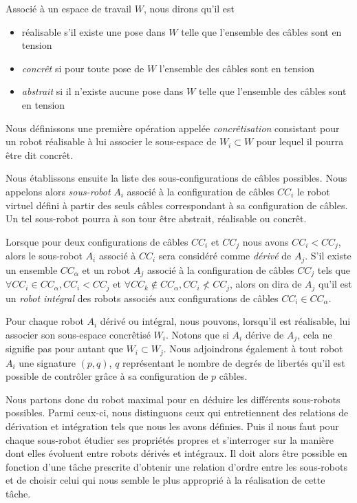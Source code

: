 Associ\'e à un espace de travail $W$, nous dirons qu'il est
\begin{itemize}
 \item {r\'ealisable} s'il existe une pose dans $W$ telle que l'ensemble des 
c\^ables sont en tension
  \item {\it concr\^et} si pour toute pose de $W$ l'ensemble des c\^ables sont 
en tension
  \item {\it abstrait} si il n'existe aucune pose dans $W$ telle que l'ensemble 
des c\^ables sont en tension
\end{itemize}

Nous d\'efinissons une première op\'eration appel\'ee {\it concr\^etisation} 
consistant pour un robot r\'ealisable \`a lui associer le sous-espace de $W_i 
\subset W$ pour lequel il pourra \^etre dit concr\^et. 

Nous \'etablissons ensuite la liste des sous-configurations de c\^ables 
possibles. Nous appelons alors {\it sous-robot} $A_i$ associ\'e \`a la 
configuration de c\^ables $CC_i$ le robot virtuel d\'efini \`a partir des seuls 
c\^ables correspondant \`a sa configuration de c\^ables. Un tel sous-robot 
pourra \`a son tour \^etre abstrait, r\'ealisable ou concr\^et.

Lorsque pour deux configurations de c\^ables $CC_i$ et $CC_j$ nous avons $CC_i< 
CC_j$, alors le sous-robot $A_i$ associ\'e \`a $CC_i$ sera consid\'er\'e comme 
{\it d\'eriv\'e} de $A_j$. S'il existe un ensemble $CC_\alpha$ et un robot 
$A_j$ associ\'e \`a la configuration de c\^ables $CC_j$ tels que $\forall CC_i 
\in CC_\alpha, CC_i < CC_j$ et $\forall CC_k \notin CC_\alpha, CC_i \nless 
CC_j$, alors on dira de $A_j$ qu'il est un {\it robot int\'egral} des robots 
associ\'es aux configurations de c\^ables $CC_i \in CC_\alpha$.

Pour chaque robot $A_i$ d\'eriv\'e ou int\'egral, nous pouvons, lorsqu'il est 
r\'ealisable, lui associer son sous-espace concr\^etis\'e $W_i$. Notons que 
si $A_i$ d\'erive de $A_j$, cela ne signifie pas pour autant que $W_i 
\subset W_j$. Nous adjoindrons \'egalement \`a tout robot $A_i$ une signature 
$(p,q)$, $q$ repr\'esentant le nombre de degr\'es de libert\'es qu'il est 
possible de contr\^oler gr\^ace \`a sa configuration de $p$ c\^ables.

Nous partons donc du robot maximal pour en d\'eduire les diff\'erents 
sous-robots possibles. Parmi ceux-ci, nous distinguons ceux qui entretiennent 
des relations de d\'erivation et int\'egration tels que nous les avons 
d\'efinies. Puis il nous faut pour chaque sous-robot \'etudier ses 
propri\'et\'es propres et s'interroger sur la mani\`ere dont elles \'evoluent 
entre robots d\'eriv\'es et int\'egraux. Il doit alors \^etre possible en 
fonction d'une t\^ache prescrite d'obtenir une relation d'ordre entre les 
sous-robots et de choisir celui qui nous semble le plus appropri\'e \`a la 
r\'ealisation de cette t\^ache.

